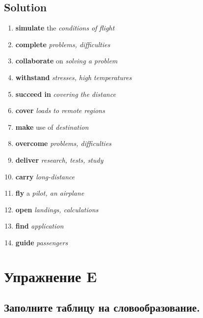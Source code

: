 \subsection*{Solution}
\begin{enumerate}
      \item \textbf{simulate} the \textit{conditions of flight}
      \item \textbf{complete} \textit{problems, difficulties}
      \item \textbf{collaborate} on \textit{solving a problem}
      \item \textbf{withstand} \textit{stresses, high temperatures}
      \item \textbf{succeed in} \textit{covering the distance}
      \item \textbf{cover} \textit{loads to remote regions}
      \item \textbf{make} use of \textit{destination}
      \item \textbf{overcome} \textit{problems, difficulties}
      \item \textbf{deliver} \textit{research, tests, study}
      \item \textbf{carry} \textit{long-distance}
      \item \textbf{fly} a \textit{pilot, an airplane}
      \item \textbf{open} \textit{landings, calculations}
      \item \textbf{find} \textit{application}
      \item \textbf{guide} \textit{passengers}
\end{enumerate}

\section{Упражнение E}
\subsection*{Заполните таблицу на словообразование.}

